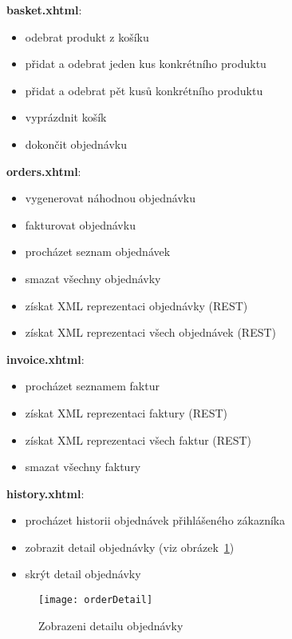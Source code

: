 \documentclass[122pt,oneside]{fithesis}
\begin{document}
{\bf basket.xhtml}:
\begin{itemize}  \itemsep0em
  \item odebrat produkt z košíku
  \item přidat a odebrat jeden kus konkrétního produktu
  \item přidat a odebrat pět kusů konkrétního produktu
  \item vyprázdnit košík
  \item dokončit objednávku
\end{itemize}
{\bf orders.xhtml}:
\begin{itemize}  \itemsep0em
  \item vygenerovat náhodnou objednávku
  \item fakturovat objednávku
  \item procházet seznam objednávek
  \item smazat všechny objednávky
  \item získat XML reprezentaci objednávky (REST)
  \item získat XML reprezentaci všech objednávek (REST)
\end{itemize}
{\bf invoice.xhtml}:
\begin{itemize}  \itemsep0em
  \item procházet seznamem faktur
  \item získat XML reprezentaci faktury (REST)
  \item získat XML reprezentaci všech faktur (REST)
  \item smazat všechny faktury
\end{itemize}
{\bf history.xhtml}:
\begin{itemize}  \itemsep0em
  \item procházet historii objednávek přihlášeného zákazníka 
  \item zobrazit detail objednávky (viz obrázek~\ref{img:orderDetail})
  \item skrýt detail objednávky
\end{itemize}

\begin{figure}[!ht]
\centering
\texttt{[image: orderDetail]}
\caption{Zobrazeni detailu objednávky}
\label{img:orderDetail}
\end{figure}


\end{document}

